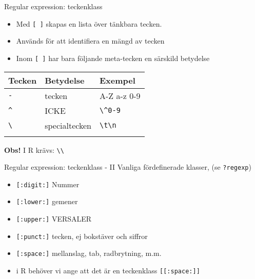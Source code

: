 \documentclass[
  10pt,
  ignorenonframetext,
  handout]{beamer}
\providecommand{\tightlist}{%
  \setlength{\itemsep}{0pt}\setlength{\parskip}{0pt}}
\begin{document}
\begin{frame}[fragile]{Regular expression: teckenklass}
\label{regular-expression-teckenklass}
\begin{itemize}
\tightlist
\item
  Med \texttt{{[}\ {]}} skapas en lista över tänkbara tecken.
\item
  Används för att identifiera en mängd av tecken
\item
  Inom \texttt{{[}\ {]}} har bara följande meta-tecken en särskild
  betydelse
\end{itemize}

\begin{longtable}[]{@{}lll@{}}
\toprule\noalign{}
Tecken & Betydelse & Exempel \\
\midrule\noalign{}
\endhead
\texttt{-} & tecken & A-Z a-z 0-9 \\
\texttt{\^{}} & ICKE & \texttt{\textbackslash{}\^{}0-9} \\
\texttt{\textbackslash{}} & specialtecken &
\texttt{\textbackslash{}t\textbackslash{}n} \\
\bottomrule\noalign{}
\end{longtable}

\textbf{Obs!} I R krävs: \texttt{\textbackslash{}\textbackslash{}}
\end{frame}

\begin{frame}[fragile]{Regular expression: teckenklass - II}
\label{regular-expression-teckenklass---ii}
Vanliga fördefinerade klasser, (se \texttt{?regexp})

\begin{itemize}
\tightlist
\item
  \texttt{{[}:digit:{]}} Nummer
\item
  \texttt{{[}:lower:{]}} gemener
\item
  \texttt{{[}:upper:{]}} VERSALER
\item
  \texttt{{[}:punct:{]}} tecken, ej bokstäver och siffror
\item
  \texttt{{[}:space:{]}} mellanslag, tab, radbrytning, m.m.
\item
  i R behöver vi ange att det är en teckenklass
  \texttt{{[}{[}:space:{]}{]}}
\end{itemize}
\end{frame}
\end{document}
